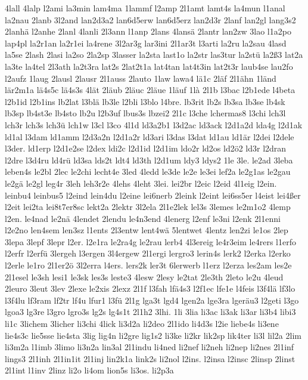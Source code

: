 {4lall
4lalp
l2ami
la3min
lam4ma
1lammf
l2amp
2l1amt
lamt4s
la4mun
l1anal
la2nau
2lanb
3l2and
lan2d3a2
lan6d5erw
lan6d5erz
lan2d3r
2lanf
lan2gl
lang3s2
2lanhä
l2anhe
2lanl
4lanli
2l3ann
l1anp
2lans
4lansä
2lantr
lan2zw
3lao
l1a2po
lap4pl
la2r1an
la2r1ei
la4rene
3l2ar3g
lar3ini
2l1ar3t
l3arti
la2ru
la2sau
4lasd
la5se
2lash
2lasi
la2so
2la2sp
3lasser
la2sta
last1o
la2str
las3tur
la2stü
la2ß3
lat2a
la3te
la4tel
2l3ath
la2t3ra
lat2s
2lat2t1a
lat4tan
lat4t3in
lat2t3r
laub4se
lau2fo
l2aufz
1laug
2lausl
2lausr
2l1auss
2lauto
1law
lawa4
lä1c
2läf
2l1ähn
1länd
lär2m1a
lä4s5c
lä4s3s
4lät
2läub
2läuc
2läue
1läuf
1là
2l1b
l3bac
l2b1ede
l4beta
l2b1id
l2b1ins
lb2lat
l3blä
lb3le
l2bli
l3blo
l4bre.
lb3rit
lb2s
lb3sa
lb3se
lb4sk
lb3sp
lb4st3e
lb4sto
lb2u
l2b3uf
lbus3s
lbzei2
2l1c
l3che
lchermas8
l3chi
lch3l
lch3r
lch3s
lch3ü
lch1w
l3cl
l3co
4l1d
ld3a2b1
l3d2ac
ld3ack
l2d1a2d
lda4g
l2d1ak
ld1al
l3dam
ld1amm
l2d3a2n
l2d1a2r
ld3ari
l3das
l3dat
ld1au
ld1är
l2dei
l2dele
l3der.
ld1erp
l2d1e2se
l2dex
ldi2c
l2d1id
l2d1im
ldo2r
ld2os
ld2ö2
ld3r
l2dran
l2dre
l3d4ru
ld4rü
ld3sa
lds2t
ldt4
ld3th
l2d1um
ldy3
ldys2
1le
3le.
le2ad
3leba
leben4s
le2bl
2lec
le2chi
lecht4e
3led
4ledd
le3de
le2e
le3ei
lef2a
le2g1as
le2gau
le2gä
le2gl
leg4r
3leh
leh3r2e
4lehs
4leht
3lei.
lei2br
l2eic
l2eid
4l1eig
l2ein.
leinbu4
leinbus5
l2eind
lein4du
l2eine
lei6nerb
2leink
l2eint
lei6ss5er
l4eist
lei4ßer
l2eit
lei2ta
lei8t7er8sc
lekt2a
2lektr
3l2ela
2l1e2lek
lel3s
3lemes
le2m1o2
4lemp
l2en.
le4nad
le2nä
4lendet
2lendu
le4n3end
4lenerg
l2enf
le3ni
l2enk
2l1enni
l2e2no
len4sem
len3sz
l1ents
2l3entw
lent4wä
5lentwet
4lentz
len2zi
le1os
2lep
3lepa
3lepf
3lepr
l2er.
l2e1ra
le2ra4g
le2rau
lerb4
4l3ereig
le4r3eim
le4rers
l1erfo
l2erfr
l2erfü
3lergeh
l3ergen
3l4ergew
2l1ergi
lergro3
lerin4s
lerk2
l2erka
l2erko
l2erle
le1ro
2l1er2ö
3l2erra
l4ers.
lers2k
ler3t
6lerwerb
l1erz
l2erza
les2am
les2e
2l1esel
le3sh
lesi1
le3sk
les3s
leste3
4lesw
2lesy
le2tat
2le3th
2leto
le2u
4leud
2leuro
3leut
3lev
2lexe
le2xis
2lexz
2l1f
l3fah
lfä4s3
l2f1ec
lfe1e
l4feis
l3f4lä
lf3lo
l3f4lu
lf3ram
lf2tr
lf4u
lfur1
l3fü
2l1g
lga3t
lgd4
lgen2a
lge3ra
lgeräu3
l2geti
l3go
lgoa3
lg3re
l3gro
lgro3s
lg2s
lg4s1t
2l1h2
3lhi.
1li
3lia
li3ac
li3ak
li3ar
li3b4
libi3
li1c
3lichem
3licher
li3chi
4lick
li3d2a
li2deo
2l1ido
li4d3s
l2ie
liebe4s
li3ene
lie4s3c
lie5sse
lie4sta
3lig
lig4n
li2gre
lig1s2
li3ke
li2kr
lik2sp
lik4ter
li3l
lil2a
2lim
li3m2a
l1imb
3limo
li3n2a
lin3al
2l1indu
li4ned
li2nef
li2neh
li2nep
li2nes
2l1inf
lings3
2l1inh
2l1in1it
2l1inj
lin2k1a
link2s
li2nol
l2ins.
l2insa
l2insc
2linsp
2linst
2l1int
l1inv
2linz
li2o
li4om
lion5s
li3os.
li2p3a
}
